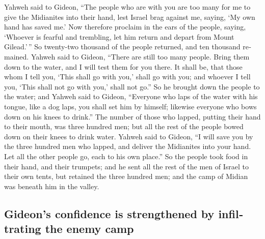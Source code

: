 \begin{paracol}{2}
\begin{otherlanguage}{english}
 Yahweh said to Gideon, ``The people who are with you are
too many for me to give the Midianites into their hand, lest Israel brag
against me, saying, `My own hand has saved me.'  Now
therefore proclaim in the ears of the people, saying, `Whoever is
fearful and trembling, let him return and depart from Mount Gilead.'\,''
So twenty-two thousand of the people returned, and ten thousand
remained.  Yahweh said to Gideon, ``There are still too
many people. Bring them down to the water, and I will test them for you
there. It shall be, that those whom I tell you, `This shall go with
you,' shall go with you; and whoever I tell you, `This shall not go with
you,' shall not go.''  So he brought down the people to
the water; and Yahweh said to Gideon, ``Everyone who laps of the water
with his tongue, like a dog laps, you shall set him by himself; likewise
everyone who bows down on his knees to drink.''  The
number of those who lapped, putting their hand to their mouth, was three
hundred men; but all the rest of the people bowed down on their knees to
drink water.  Yahweh said to Gideon, ``I will save you by
the three hundred men who lapped, and deliver the Midianites into your
hand. Let all the other people go, each to his own place.''
 So the people took food in their hand, and their
trumpets; and he sent all the rest of the men of Israel to their own
tents, but retained the three hundred men; and the camp of Midian was
beneath him in the valley.

\hypertarget{gideons-confidence-is-strengthened-by-infiltrating-the-enemy-camp}{%
\subsection{Gideon's confidence is strengthened by infiltrating the
enemy
camp}\label{gideons-confidence-is-strengthened-by-infiltrating-the-enemy-camp}}


\end{otherlanguage}
\end{paracol}
